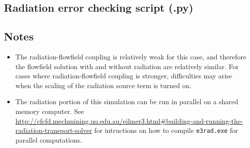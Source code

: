 \topbar

\bottombar

% 

\subsection{Radiation error checking script (.py)}
\topbar

\bottombar

\subsection{Notes}

\begin{itemize}
 \item The radiation-flowfield coupling is relatively weak for this case, and therefore the flowfield solution with and without radiation are relatively similar.
For cases where radiation-flowfield coupling is stronger, difficulties may arise when the scaling of the radiation source term is turned on.
 \item The radiation portion of this simulation can be run in parallel on a shared memory computer.  See \url{http://cfcfd.mechmining.uq.edu.au/eilmer3.html#building-and-running-the-radiation-transport-solver} for intructions on how to compile \texttt{e3rad.exe} for parallel computations.
\end{itemize}